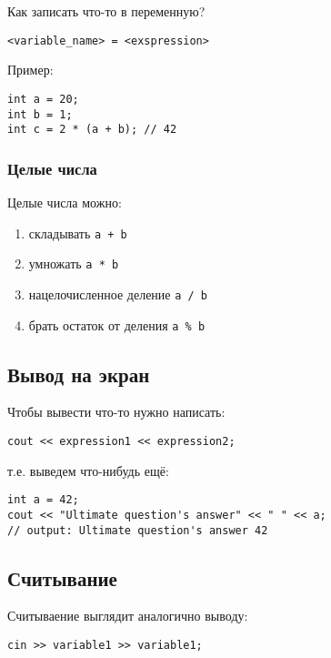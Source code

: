 \documentclass[10pt,a4paper]{article}
\begin{document}
Как записать что-то в переменную?

\begin{lstlisting}
<variable_name> = <exspression>
\end{lstlisting}

Пример:

\begin{lstlisting}
int a = 20;
int b = 1;
int c = 2 * (a + b); // 42
\end{lstlisting}

\subsubsection*{Целые числа}

Целые числа можно:

\begin{enumerate}
\item складывать \lstinline|a + b|
\item умножать \lstinline|a * b|
\item нацелочисленное деление \lstinline|a / b|
\item брать остаток от деления \lstinline|a % b|
\end{enumerate}

\subsection*{Вывод на экран}

Чтобы вывести что-то нужно написать:

\begin{lstlisting}
cout << expression1 << expression2;
\end{lstlisting}

т.е. выведем что-нибудь ещё:

\begin{lstlisting}
int a = 42;
cout << "Ultimate question's answer" << " " << a; 
// output: Ultimate question's answer 42
\end{lstlisting}

\subsection*{Считывание}

Считываение выглядит аналогично выводу:

\begin{lstlisting}
cin >> variable1 >> variable1;
\end{lstlisting}
\end{document}
